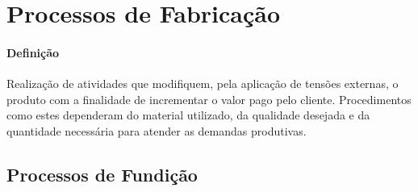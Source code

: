 \documentclass{article}
\begin{document}
    \section{Processos de Fabricação}
        \paragraph{Definição}Realização de atividades que modifiquem, pela aplicação de tensões externas, o produto com a finalidade de incrementar o valor pago pelo cliente. Procedimentos como estes dependeram do material utilizado, da qualidade desejada e da quantidade necessária para atender as demandas produtivas.

        \subsection{Processos de Fundição}
\end{document}
